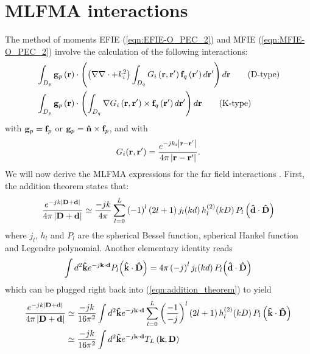 \chapter{MLFMA interactions}
%
\par
The method of moments EFIE (\ref{eqn:EFIE-O_PEC_2}) and MFIE (\ref{eqn:MFIE-O_PEC_2}) involve the calculation of the following interactions:
\begin{align}
& \int_{D_p} \mathbf{g}_p\left(\mathbf{r}\right) \cdot \left(\left(\nabla \nabla \cdot + k_i^2\right) \int_{D_q} G_i\left(\mathbf{r}, \mathbf{r}'\right) \mathbf{f}_q\left(\mathbf{r}'\right) d\mathbf{r}' \right) d\mathbf{r} \qquad \text{(D-type)} \label{eqn:interaction_D}\\
& \int_{D_p} \mathbf{g}_p\left(\mathbf{r}\right) \cdot \left( \int_{D_q} \nabla G_i\left(\mathbf{r}, \mathbf{r}'\right) \times \mathbf{f}_q\left(\mathbf{r}'\right) d\mathbf{r}' \right) d\mathbf{r} \qquad \text{(K-type)} \label{eqn:interaction_K}
\end{align}
with $\mathbf{g}_p = \mathbf{f}_p$ or $\mathbf{g}_p = \mathbf{\Hat{n}}\times\mathbf{f}_p$, and with
\begin{equation*}
G_i(\mathbf{r}, \mathbf{r}') = \frac{e^{-jk_i \left|\mathbf{r} - \mathbf{r}'  \right|}}{4 \pi \left|\mathbf{r} - \mathbf{r}'  \right|}.
\end{equation*}
We will now derive the MLFMA expressions for the far field interactions \cite{Chew_01}. First, the addition theorem states that:
\begin{equation}\label{eqn:addition_theorem}
\frac{e^{-jk \left|\mathbf{D} + \mathbf{d}  \right|}}{4 \pi \left|\mathbf{D} + \mathbf{d} \right|} \simeq \frac{-jk}{4 \pi} \sum_{l = 0}^L \left(-1\right)^l \left(2l+1 \right) j_l \! \left(k d\right) h_l^{(2)}\! \left(k D\right) P_l\left(\mathbf{\hat{d}} \cdot \mathbf{\hat{D}} \right)
\end{equation}
where $j_l$, $h_l$ and $P_l$ are the spherical Bessel function, spherical Hankel function and Legendre polynomial. Another elementary identity reads
\begin{equation}
\int d^2\mathbf{\hat{k}} e^{-j\mathbf{k} \cdot \mathbf{d}} P_l \! \left(\mathbf{\hat{k}} \cdot \mathbf{\hat{D}}\right) = 4 \pi \left(-j \right)^l j_l \! \left(k d\right) P_l \! \left(\mathbf{\hat{d}} \cdot \mathbf{\hat{D}}\right)
\end{equation}
which can be plugged right back into (\ref{eqn:addition_theorem}) to yield
\begin{equation}\label{eqn:addition_theorem_2}
\begin{split}
\frac{e^{-jk \left|\mathbf{D} + \mathbf{d}  \right|}}{4 \pi \left|\mathbf{D} + \mathbf{d} \right|} &\simeq \frac{-jk}{16 \pi^2} \int d^2\mathbf{\hat{k}} e^{-j\mathbf{k} \cdot \mathbf{d}} \sum_{l = 0}^L \left(\frac{-1}{-j}\right)^l \left(2l+1 \right) h_l^{(2)}\! \left(k D\right) P_l\left(\mathbf{\hat{k}} \cdot \mathbf{\hat{D}} \right) \\
&\simeq \frac{-jk}{16 \pi^2} \int d^2\mathbf{\hat{k}} e^{-j\mathbf{k} \cdot \mathbf{d}} T_L\left(\mathbf{k}, \mathbf{D} \right)
\end{split}
\end{equation}
